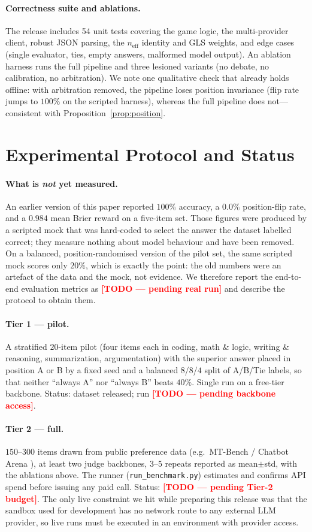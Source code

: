 \documentclass[11pt]{article}
\newcommand{\neff}{n_{\mathrm{eff}}}
\newcommand{\todo}[1]{\textcolor{red}{\textbf{[TODO --- #1]}}}
\begin{document}
\paragraph{Correctness suite and ablations.} The release includes 54 unit tests
covering the game logic, the multi-provider client, robust JSON parsing, the
$\neff$ identity and GLS weights, and edge cases (single evaluator, ties, empty
answers, malformed model output). An ablation harness runs the full pipeline and
three lesioned variants (no debate, no calibration, no arbitration). We note one
qualitative check that already holds offline: with arbitration removed, the
pipeline loses position invariance (flip rate jumps to $100\%$ on the scripted
harness), whereas the full pipeline does not---consistent with
Proposition~\ref{prop:position}.

\section{Experimental Protocol and Status}
\paragraph{What is \emph{not} yet measured.} An earlier version of this paper
reported $100\%$ accuracy, a $0.0\%$ position-flip rate, and a $0.984$ mean
Brier reward on a five-item set. Those figures were produced by a scripted mock
that was hard-coded to select the answer the dataset labelled correct; they
measure nothing about model behaviour and have been removed. On a balanced,
position-randomised version of the pilot set, the same scripted mock scores only
$20\%$, which is exactly the point: the old numbers were an artefact of the data
and the mock, not evidence. We therefore report the end-to-end evaluation
metrics as \todo{pending real run} and describe the protocol to obtain them.

\paragraph{Tier 1 --- pilot.} A stratified $20$-item pilot (four items each in
coding, math \& logic, writing \& reasoning, summarization, argumentation) with
the superior answer placed in position A or B by a fixed seed and a balanced
$8$/$8$/$4$ split of A/B/Tie labels, so that neither ``always A'' nor ``always
B'' beats $40\%$. Single run on a free-tier backbone. Status: dataset released;
run \todo{pending backbone access}.

\paragraph{Tier 2 --- full.} $150$--$300$ items drawn from public preference
data (e.g.\ MT-Bench / Chatbot Arena \citep{zheng2023}), at least two judge
backbones, $3$--$5$ repeats reported as mean$\pm$std, with the ablations above.
The runner (\texttt{run\_benchmark.py}) estimates and confirms API spend before
issuing any paid call. Status: \todo{pending Tier-2 budget}. The only live
constraint we hit while preparing this release was that the sandbox used for
development has no network route to any external LLM provider, so live runs must
be executed in an environment with provider access.
\end{document}
